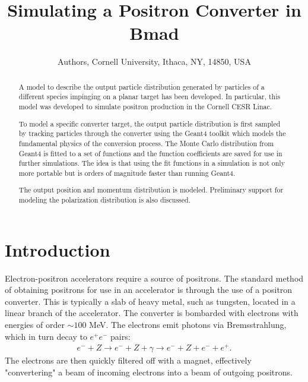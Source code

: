 \documentclass[letter,
               biblatex,     %
               keeplastbox,   %
               ]{jacow}
\begin{document}
\title{Simulating a Positron Converter in Bmad}

\author{Authors, Cornell University, Ithaca, NY, 14850, USA}

\maketitle

\begin{abstract}
A model to describe the output particle distribution generated by particles of a different species
impinging on a planar target has been developed. In particular, this model was developed to simulate
positron production in the Cornell CESR Linac.

To model a specific converter target, the output particle distribution is first sampled by tracking
particles through the converter using the Geant4 toolkit which models the fundamental physics of the
conversion process. The Monte Carlo distribution from Geant4 is fitted to a set of functions and the
function coefficients are saved for use in further simulations. The idea is that using the fit
functions in a simulation is not only more portable but is orders of magnitude faster than running
Geant4.

The output position and momentum distribution is modeled. Preliminary support for modeling the
polarization distribution is also discussed.
\end{abstract}

\section{Introduction}


Electron-positron accelerators require a source of positrons.
The standard method of obtaining positrons for use in an accelerator is through the use of a positron converter.
This is typically a slab of heavy metal, such as tungsten, located in a linear branch of the accelerator.
The converter is bombarded with electrons with energies of order $\sim 100$ MeV.
The electrons emit photons via Bremsstrahlung, which in turn decay to $e^+ e^-$ pairs:
\begin{align*}
e^- + Z \rightarrow e^- + Z + \gamma \rightarrow e^- + Z + e^- + e^+.
\end{align*}
The electrons are then quickly filtered off with a %
magnet, effectively "convertering" a beam of incoming electrons into a beam of outgoing positrons.
\end{document}
